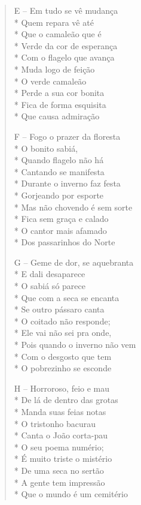 \begin{verse}
E -- Em tudo se vê mudança\\*
Quem repara vê até\\*
Que o camaleão que é\\*
Verde da cor de esperança\\*
Com o flagelo que avança\\*
Muda logo de feição\\*
O verde camaleão\\*
Perde a sua cor bonita\\*
Fica de forma esquisita\\*
Que causa admiração

F -- Fogo o prazer da floresta\\*
O bonito sabiá,\\*
Quando flagelo não há\\*
Cantando se manifesta\\*
Durante o inverno faz festa\\*
Gorjeando por esporte\\*
Mas não chovendo é sem sorte\\*
Fica sem graça e calado\\*
O cantor mais afamado\\*
Dos passarinhos do Norte

G -- Geme de dor, se aquebranta\\*
E dali desaparece\\*
O sabiá só parece\\*
Que com a seca se encanta\\*
Se outro pássaro canta\\*
O coitado não responde;\\*
Ele vai não sei pra onde,\\*
Pois quando o inverno não vem\\*
Com o desgosto que tem\\*
O pobrezinho se esconde

H -- Horroroso, feio e mau\\*
De lá de dentro das grotas\\*
Manda suas feias notas\\*
O tristonho bacurau\\*
Canta o João corta-pau\\*
O seu poema numério;\\*
É muito triste o mistério\\*
De uma seca no sertão\\*
A gente tem impressão\\*
Que o mundo é um cemitério


\end{verse}
